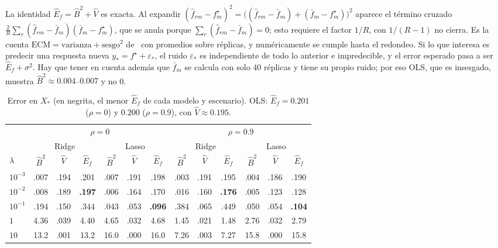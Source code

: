 \documentclass[10pt,a4paper]{article}
\begin{document}
La identidad $\hat E_f=\hat B^2+\hat V$ es exacta. Al expandir $(\hat f_{rm}-f^\star_m)^2=\big((\hat f_{rm}-\bar f_m)+(\bar f_m-f^\star_m)\big)^2$ aparece el término cruzado $\tfrac2R\sum_r(\hat f_{rm}-\bar f_m)(\bar f_m-f^\star_m)$, que se anula porque $\sum_r(\hat f_{rm}-\bar f_m)=0$; esto requiere el factor $1/R$, con $1/(R-1)$ no cierra. Es la cuenta $\text{ECM}=\text{varianza}+\text{sesgo}^2$ de~\cite[secc.~4.7.6]{pml1} con promedios sobre réplicas, y numéricamente se cumple hasta el redondeo. Si lo que interesa es predecir una respuesta nueva $y_*=f^\star+\varepsilon_*$, el ruido $\varepsilon_*$ es independiente de todo lo anterior e impredecible, y el error esperado pasa a ser $\hat E_f+\sigma^2$. Hay que tener en cuenta además que $\bar f_m$ se calcula con solo 40 réplicas y tiene su propio ruido; por eso OLS, que es insesgado, muestra $\hat B^2\approx0.004$--$0.007$ y no 0.

\begin{table}[h]\centering\small
\caption{Error en $X_*$ (en negrita, el menor $\hat E_f$ de cada modelo y escenario). OLS: $\hat E_f=0.201$ ($\rho=0$) y $0.200$ ($\rho=0.9$), con $\hat V\approx0.195$.}\label{tab:p5}
\begin{tabular}{l ccc ccc | ccc ccc}\toprule
& \multicolumn{6}{c|}{$\rho=0$} & \multicolumn{6}{c}{$\rho=0.9$}\\
& \multicolumn{3}{c}{Ridge} & \multicolumn{3}{c|}{Lasso} & \multicolumn{3}{c}{Ridge} & \multicolumn{3}{c}{Lasso}\\
$\lambda$ & $\hat B^2$ & $\hat V$ & $\hat E_f$ & $\hat B^2$ & $\hat V$ & $\hat E_f$ & $\hat B^2$ & $\hat V$ & $\hat E_f$ & $\hat B^2$ & $\hat V$ & $\hat E_f$\\\midrule
$10^{-3}$ & .007 & .194 & .201 & .007 & .191 & .198 & .003 & .191 & .195 & .004 & .186 & .190\\
$10^{-2}$ & .008 & .189 & \textbf{.197} & .006 & .164 & .170 & .016 & .160 & \textbf{.176} & .005 & .123 & .128\\
$10^{-1}$ & .194 & .150 & .344 & .043 & .053 & \textbf{.096} & .384 & .065 & .449 & .050 & .054 & \textbf{.104}\\
$1$ & 4.36 & .039 & 4.40 & 4.65 & .032 & 4.68 & 1.45 & .021 & 1.48 & 2.76 & .032 & 2.79\\
$10$ & 13.2 & .001 & 13.2 & 16.0 & .000 & 16.0 & 7.26 & .003 & 7.27 & 15.8 & .000 & 15.8\\\bottomrule
\end{tabular}\end{table}
\end{document}

